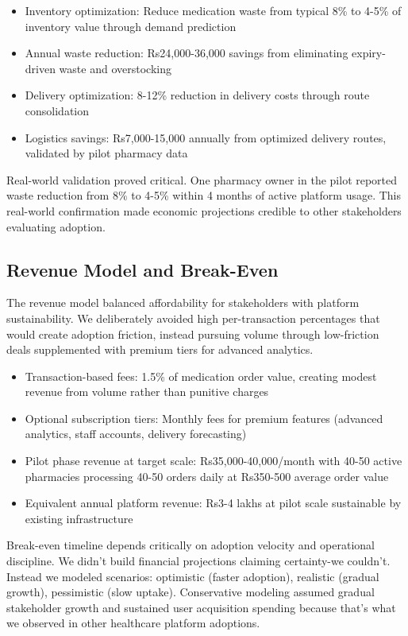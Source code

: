 \documentclass[12pt,a4paper]{report}
\begin{document}
\begin{itemize}
  \item Inventory optimization: Reduce medication waste from typical 8\% to 4-5\% of inventory value through demand prediction
  \item Annual waste reduction: Rs24,000-36,000 savings from eliminating expiry-driven waste and overstocking
  \item Delivery optimization: 8-12\% reduction in delivery costs through route consolidation
  \item Logistics savings: Rs7,000-15,000 annually from optimized delivery routes, validated by pilot pharmacy data
\end{itemize}

Real-world validation proved critical. One pharmacy owner in the pilot reported waste reduction from 8\% to 4-5\% within 4 months of active platform usage. This real-world confirmation made economic projections credible to other stakeholders evaluating adoption.

\subsection{Revenue Model and Break-Even}

The revenue model balanced affordability for stakeholders with platform sustainability. We deliberately avoided high per-transaction percentages that would create adoption friction, instead pursuing volume through low-friction deals supplemented with premium tiers for advanced analytics.

\begin{itemize}
  \item Transaction-based fees: 1.5\% of medication order value, creating modest revenue from volume rather than punitive charges
  \item Optional subscription tiers: Monthly fees for premium features (advanced analytics, staff accounts, delivery forecasting)
  \item Pilot phase revenue at target scale: Rs35,000-40,000/month with 40-50 active pharmacies processing 40-50 orders daily at Rs350-500 average order value
  \item Equivalent annual platform revenue: Rs3-4 lakhs at pilot scale sustainable by existing infrastructure
\end{itemize}

Break-even timeline depends critically on adoption velocity and operational discipline. We didn't build financial projections claiming certainty-we couldn't. Instead we modeled scenarios: optimistic (faster adoption), realistic (gradual growth), pessimistic (slow uptake). Conservative modeling assumed gradual stakeholder growth and sustained user acquisition spending because that's what we observed in other healthcare platform adoptions.
\end{document}
